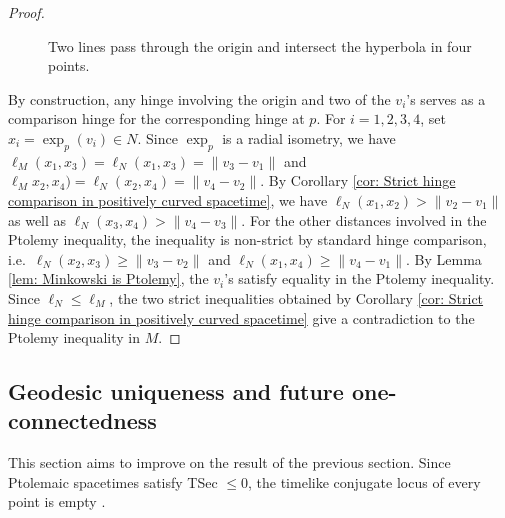 \documentclass[hidelinks,12pt,a4paper]{article}
\numberwithin{equation}{section}
\theoremstyle{plain}
\theoremstyle{definition}
\begin{document}
\begin{proof}
\begin{figure}
\begin{center}
\end{center}
\caption{Two lines pass through the origin and intersect the hyperbola in four points. 
}
\label{fig: two lines through hyperbola}
\end{figure} 

By construction, any hinge involving the origin and two of the $v_i$'s serves as a comparison hinge for the corresponding hinge at $p$. 
For $i=1,2,3,4$, set $x_i=\exp_p(v_i) \in N$.
Since $\exp_p$ is a radial isometry, we have $\ell_M(x_1,x_3)=\ell_N(x_1,x_3)=\|v_3 - v_1\|$ and $\ell_Mx_2,x_4)=\ell_N(x_2,x_4)=\|v_4 - v_2 \|$. 
By Corollary \ref{cor: Strict hinge comparison in positively curved spacetime}, we have $\ell_N(x_1,x_2) > \|v_2 - v_1\|$ as well as $\ell_N(x_3,x_4) > \|v_4 - v_3\|$. 
For the other distances involved in the Ptolemy inequality, the inequality is non-strict by standard hinge comparison, i.e.\ $\ell_N(x_2,x_3) \geq \|v_3- v_2\|$ and $\ell_N(x_1,x_4) \geq \|v_4- v_1\|$. 
By Lemma \ref{lem: Minkowski is Ptolemy}, the $v_i$'s satisfy equality in the Ptolemy inequality. 
Since $\ell_N \leq \ell_M$, the two strict inequalities obtained by Corollary \ref{cor: Strict hinge comparison in positively curved spacetime} give a contradiction to the Ptolemy inequality in $M$. 
\end{proof}

\subsection{Geodesic uniqueness and future one-connectedness}
This section aims to improve on the result of the previous section. 
Since Ptolemaic spacetimes satisfy TSec $\leq 0$, the timelike conjugate locus of every point is empty \cite[Proposition 11.13]{BeemBook}. 
\end{document}
